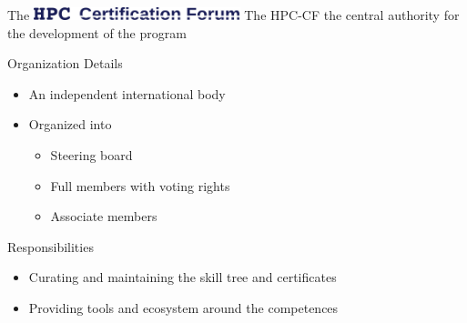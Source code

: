 \documentclass[compress,aspectratio=169]{beamer}
\begin{document}
\begin{frame}{The \includegraphics[width=0.45\textwidth]{hpccf-full}}
	The HPC-CF the central authority for the development of the program

	\begin{block}{Organization Details}
		\begin{itemize}
			\item An independent international body
			\item Organized into
				\begin{itemize}
					\item Steering board
					\item Full members with voting rights
					\item Associate members
				\end{itemize}
		\end{itemize}
	\end{block}

	\begin{block}{Responsibilities}
		\begin{itemize}
			\item Curating and maintaining the skill tree and certificates
			\item Providing tools and ecosystem around the competences
		\end{itemize}
	\end{block}
\end{frame}
\end{document}
